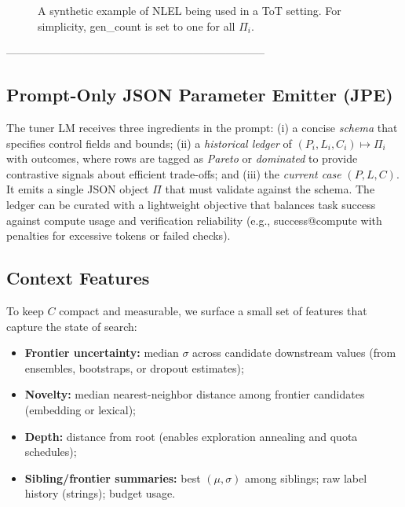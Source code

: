 \documentclass{article}
\theoremstyle{plain}
\theoremstyle{definition}
\theoremstyle{remark}
\begin{document}
\begin{figure*}[!t]
  \caption{A synthetic example of NLEL being used in a ToT setting. For simplicity, gen\_count is set to one for all $\Pi_i$.}
  \label{fig:nlel_schematic}
\end{figure*}
 -----------------------------------------------------------------------

\subsection{Prompt-Only JSON Parameter Emitter (JPE)}
\label{subsec:jpe}
The tuner LM receives three ingredients in the prompt: (i) a concise \emph{schema} that specifies control fields and bounds; (ii) a \emph{historical ledger} of $(P_i,L_i,C_i)\!\mapsto\!\Pi_i$ with outcomes, where rows are tagged as \emph{Pareto} or \emph{dominated} to provide contrastive signals about efficient trade-offs; and (iii) the \emph{current case} $(P,L,C)$. It emits a single JSON object $\Pi$ that must validate against the schema. The ledger can be curated with a lightweight objective that balances task success against compute usage and verification reliability (e.g., success@compute with penalties for excessive tokens or failed checks).

\subsection{Context Features}
To keep $C$ compact and measurable, we surface a small set of features that capture the state of search:
\begin{itemize}
  \item \textbf{Frontier uncertainty:} median $\sigma$ across candidate downstream values (from ensembles, bootstraps, or dropout estimates);
  \item \textbf{Novelty:} median nearest-neighbor distance among frontier candidates (embedding or lexical);
  \item \textbf{Depth:} distance from root (enables exploration annealing and quota schedules);
  \item \textbf{Sibling/frontier summaries:} best $(\mu,\sigma)$ among siblings; raw label history (strings); budget usage.
\end{itemize}
\end{document}

